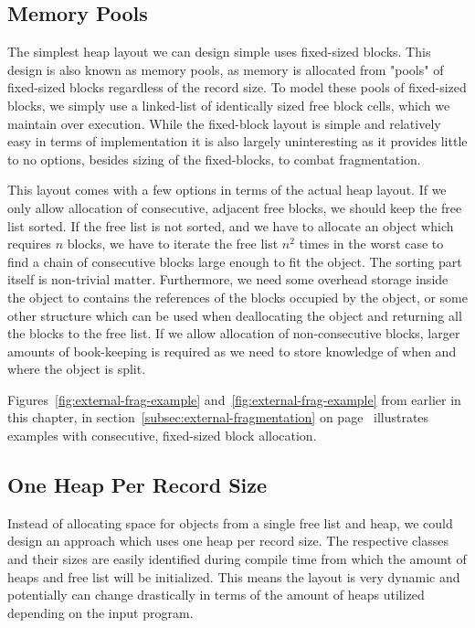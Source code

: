 \subsection{Memory Pools}
\label{subsec:memory-pools}
The simplest heap layout we can design simple uses fixed-sized blocks. This design is also known as memory pools, as memory is allocated from "pools" of fixed-sized blocks regardless of the record size.
To model these pools of fixed-sized blocks, we simply use a linked-list of identically sized free block cells, which we maintain over execution.
While the fixed-block layout is simple and relatively easy in terms of implementation it is also largely uninteresting as it provides little to no options, besides sizing of the fixed-blocks, to combat fragmentation.

This layout comes with a few options in terms of the actual heap layout. If we only allow allocation of consecutive, adjacent free blocks, we should keep the free list sorted. If the free list is not sorted, and we have to allocate an object which requires $n$ blocks, we have to iterate the free list $n^2$ times in the worst case to find a chain of consecutive blocks large enough to fit the object. The sorting part itself is non-trivial matter. Furthermore, we need some overhead storage inside the object to contains the references of the blocks occupied by the object, or some other structure which can be used when deallocating the object and returning all the blocks to the free list. If we allow allocation of non-consecutive blocks, larger amounts of book-keeping is required as we need to store knowledge of when and where the object is split.

Figures~\ref{fig:external-frag-example} and~\ref{fig:external-frag-example} from earlier in this chapter, in section~\ref{subsec:external-fragmentation} on page~\pageref{fig:external-frag-example} illustrates examples with consecutive, fixed-sized block allocation. 


\subsection{One Heap Per Record Size}
\label{subsec:one-heap-per-record-size}
Instead of allocating space for objects from a single free list and heap, we could design an approach which uses one heap per record size. The respective classes and their sizes are easily identified during compile time from which the amount of heaps and free list will be initialized. This means the layout is very dynamic and potentially can change drastically in terms of the amount of heaps utilized depending on the input program. 

